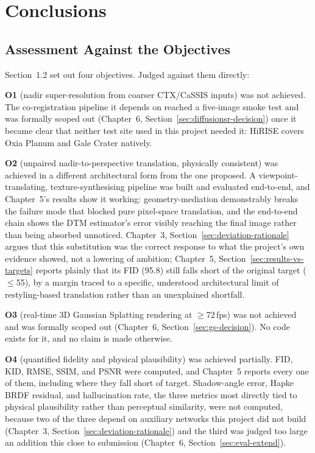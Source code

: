 \chapter{Conclusions}
\label{ch:conclusions}

\section{Assessment Against the Objectives}
\label{sec:conclusions-objectives}

Section~1.2 set out four objectives. Judged against them directly:

\textbf{O1} (nadir super-resolution from coarser CTX/CaSSIS inputs) was not achieved. The co-registration pipeline it depends on reached a five-image smoke test and was formally scoped out (Chapter~6, Section~\ref{sec:diffusionsr-decision}) once it became clear that neither test site used in this project needed it: HiRISE covers Oxia Planum and Gale Crater natively.

\textbf{O2} (unpaired nadir-to-perspective translation, physically consistent) was achieved in a different architectural form from the one proposed. A viewpoint-translating, texture-synthesising pipeline was built and evaluated end-to-end, and Chapter~5's results show it working: geometry-mediation demonstrably breaks the failure mode that blocked pure pixel-space translation, and the end-to-end chain shows the DTM estimator's error visibly reaching the final image rather than being absorbed unnoticed. Chapter~3, Section~\ref{sec:deviation-rationale} argues that this substitution was the correct response to what the project's own evidence showed, not a lowering of ambition; Chapter~5, Section~\ref{sec:results-vs-targets} reports plainly that its FID (95.8) still falls short of the original target (\,$\leq$55), by a margin traced to a specific, understood architectural limit of restyling-based translation rather than an unexplained shortfall.

\textbf{O3} (real-time 3D Gaussian Splatting rendering at $\geq$72\,fps) was not achieved and was formally scoped out (Chapter~6, Section~\ref{sec:gs-decision}). No code exists for it, and no claim is made otherwise.

\textbf{O4} (quantified fidelity and physical plausibility) was achieved partially. FID, KID, RMSE, SSIM, and PSNR were computed, and Chapter~5 reports every one of them, including where they fall short of target. Shadow-angle error, Hapke BRDF residual, and hallucination rate, the three metrics most directly tied to physical plausibility rather than perceptual similarity, were not computed, because two of the three depend on auxiliary networks this project did not build (Chapter~3, Section~\ref{sec:deviation-rationale}) and the third was judged too large an addition this close to submission (Chapter~6, Section~\ref{sec:eval-extend}).

